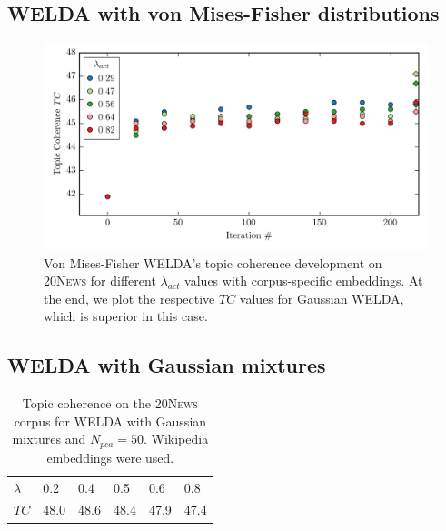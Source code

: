 \documentclass[
        a4paper,
        titlepage,
        twoside,
        parskip,
        numbers=noenddot
        ]{scrbook}
\newcommand{\ra}[1]{\renewcommand{\arraystretch}{#1}}
\theoremstyle{break}
\begin{document}
\begin{appendices}
  \subsection{WELDA with von Mises-Fisher distributions}
  \label{sec:appendix_welda_vmf}
  \begin{figure}[H]
         \centering
         \includegraphics[width=\textwidth]{figures/welda_vmf_20news.png}
         \caption{Von Mises-Fisher WELDA's topic coherence development on \textsc{20News} for different $\lambda_{act}$ values with corpus-specific embeddings. At the end, we plot the respective $TC$ values for Gaussian WELDA, which is superior in this case.}
         \label{fig:welda_vmf_20news}
  \end{figure}

  \subsection{WELDA with Gaussian mixtures}
  \label{sec:appendix_welda_gm}
  \begin{table}[]
    \ra{1.3}
    \centering
    \caption{Topic coherence on the \textsc{20News} corpus for WELDA with Gaussian mixtures and $N_{pca} = 50$. Wikipedia embeddings were used.}
    \label{table:welda_gm}
    \begin{tabular}{llllll}
      \toprule
      $\lambda$ & 0.2  & 0.4  & 0.5  & 0.6  & 0.8  \\
      $TC$     & 48.0 & 48.6 & 48.4 & 47.9 & 47.4 \\
      \bottomrule
    \end{tabular}
  \end{table}


\end{appendices}
\end{document}
